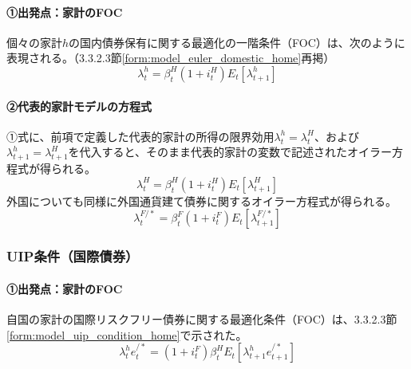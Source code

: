 \paragraph{①出発点：家計のFOC}\label{sec:model_final_equations_utility_euler_origin}
個々の家計\(h\)の国内債券保有に関する最適化の一階条件（FOC）は、次のように表現される。（3.3.2.3節\eqref{form:model_euler_domestic_home}再掲）
\begin{equation}
\lambda_t^h=\beta_t^H(1+i_t^H)E_t[\lambda_{t+1}^h]
\label{form:model_final_equations_utility_euler_restated}
\end{equation}

\paragraph{②代表的家計モデルの方程式}\label{sec:model_final_equations_utility_euler_ra_eq}
①式に、前項で定義した代表的家計の所得の限界効用\(\lambda_t^h=\lambda_t^H\)、および\(\lambda_{t+1}^h=\lambda_{t+1}^H\)を代入すると、そのまま代表的家計の変数で記述されたオイラー方程式が得られる。
\begin{equation}
\lambda_t^H=\beta_t^H(1+i_t^H)E_t[\lambda_{t+1}^H]
\label{form:model_final_equations_utility_euler_h}
\end{equation}
外国についても同様に外国通貨建て債券に関するオイラー方程式が得られる。
\begin{equation}
\lambda_t^{F/*}=\beta_t^F(1+i_t^F)E_t[\lambda_{t+1}^{F/*}]
\label{form:model_final_equations_utility_euler_f}
\end{equation}

\subsubsection{UIP条件（国際債券）}
\label{sec:model_final_equations_utility_uip}
\paragraph{①出発点：家計のFOC}\label{sec:model_final_equations_utility_uip_origin}
自国の家計の国際リスクフリー債券に関する最適化条件（FOC）は、3.3.2.3節\eqref{form:model_uip_condition_home}で示された。
\begin{equation}
\lambda_t^he_t^{/*}=(1+i_t^F)\beta_t^HE_t[\lambda_{t+1}^he_{t+1}^{/*}]
\label{form:model_final_equations_utility_uip_restated}
\end{equation}

